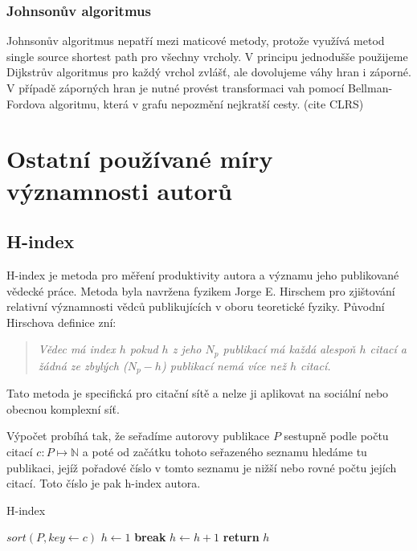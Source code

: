 \documentclass[12pt,titlepage]{report}
\begin{document}
\subsubsection{Johnsonův algoritmus}
Johnsonův algoritmus nepatří mezi maticové metody, protože využívá
metod single source shortest path pro všechny vrcholy. V principu jednodušše
použijeme Dijkstrův algoritmus pro každý vrchol zvlášť, ale dovolujeme váhy
hran i záporné. V případě záporných hran je nutné provést transformaci vah
pomocí Bellman-Fordova algoritmu, která v grafu nepozmění nejkratší cesty. 
(cite CLRS)


\section{Ostatní používané míry významnosti autorů}
\subsection{H-index}
H-index je metoda pro měření produktivity autora a významu jeho publikované
vědecké práce.  Metoda byla navržena fyzikem Jorge E. Hirschem pro zjištování
relativní významnosti vědců publikujících v oboru teoretické fyziky. Původní
Hirschova definice zní:

\begin{quote}\textit{
Vědec má index $h$ pokud $h$ z jeho $N_p$ publikací má každá alespoň $h$ citací
a žádná ze zbylých ($N_p - h$) publikací nemá více než $h$ citací.
}
\end{quote}

Tato metoda je specifická pro citační sítě a nelze ji aplikovat na sociální
nebo obecnou komplexní síť.

Výpočet probíhá tak, že seřadíme autorovy publikace $P$ sestupně podle počtu
citací $c: P \mapsto \mathbb{N}$ a poté od začátku tohoto seřazeného seznamu
hledáme tu publikaci, jejíž pořadové číslo v tomto seznamu je nižší nebo rovné
počtu jejích citací. Toto číslo je pak h-index autora.
\begin{center}
\begin{minipage}{\textwidth}
\begin{algorithm}[H]
	\caption{H-index}
		\label{alg:hindex}

	\begin{algorithmic}[1]
	\Statex
		\State $sort(P, key \gets c)$
		\State $h \gets 1$
				\State \textbf{break}
			\EndIf
			\State $h \gets h + 1$
		\EndFor
		\State \textbf{return} $h$
	\EndFunction
	\end{algorithmic}
\end{algorithm}
\end{minipage}
\end{center}
\mbox{}
\end{document}
